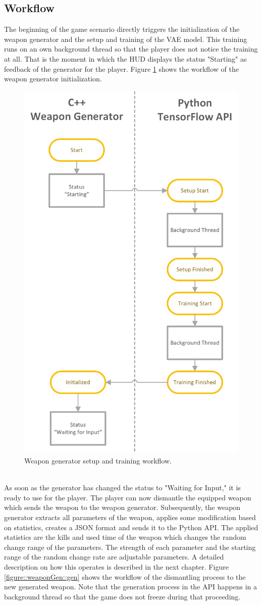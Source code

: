 \documentclass[MGS,Master,english]{twbook}%
\begin{document}
\subsection{Workflow}
The beginning of the game scenario directly triggers the initialization of the weapon generator and the setup and training of the VAE model. This training runs on an own background thread so that the player does not notice the training at all. That is the moment in which the HUD displays the status "Starting" as feedback of the generator for the player. Figure \ref{figure::weaponGen::init} shows the workflow of the weapon generator initialization.
\begin{figure}[!ht]
	\centering
	\includegraphics[width=0.5\linewidth]{PICs/WeaponGeneratorWorkflow_Setup_Training}
	\caption{Weapon generator setup and training workflow.} \label{figure::weaponGen::init}
\end{figure}\\
As soon as the generator has changed the status to "Waiting for Input," it is ready to use for the player. The player can now dismantle the equipped weapon which sends the weapon to the weapon generator. Subsequently, the weapon generator extracts all parameters of the weapon, applies some modification based on statistics, creates a JSON format and sends it to the Python API. The applied statistics are the kills and used time of the weapon which changes the random change range of the parameters. The strength of each parameter and the starting range of the random change rate are adjustable parameters. A detailed description on how this operates is described in the next chapter. Figure \ref{figure::weaponGen::gen} shows the workflow of the dismantling process to the new generated weapon. Note that the generation process in the API happens in a background thread so that the game does not freeze during that proceeding.
\end{document}
